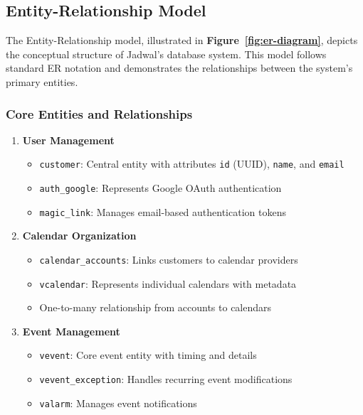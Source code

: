 \documentclass[12pt,a4paper]{report}
\begin{document}
\subsection{Entity-Relationship Model}

The Entity-Relationship model, illustrated in \textbf{Figure~\ref{fig:er-diagram}}, depicts the conceptual structure of Jadwal's database system. This model follows standard ER notation and demonstrates the relationships between the system's primary entities.

\subsubsection{Core Entities and Relationships}

\begin{enumerate}
    \item \textbf{User Management}
          \begin{itemize}
              \item \texttt{customer}: Central entity with attributes \texttt{id} (UUID), \texttt{name}, and \texttt{email}
              \item \texttt{auth\_google}: Represents Google OAuth authentication
              \item \texttt{magic\_link}: Manages email-based authentication tokens
          \end{itemize}

    \item \textbf{Calendar Organization}
          \begin{itemize}
              \item \texttt{calendar\_accounts}: Links customers to calendar providers
              \item \texttt{vcalendar}: Represents individual calendars with metadata
              \item One-to-many relationship from accounts to calendars
          \end{itemize}

    \item \textbf{Event Management}
          \begin{itemize}
              \item \texttt{vevent}: Core event entity with timing and details
              \item \texttt{vevent\_exception}: Handles recurring event modifications
              \item \texttt{valarm}: Manages event notifications
          \end{itemize}
\end{enumerate}
\end{document}
